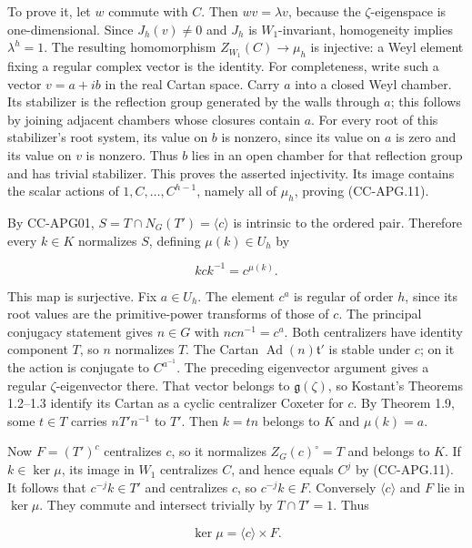 \documentclass[11pt,a4paper]{article}
\theoremstyle{definition}\newtheorem{definition}[theorem]{Definition}
\theoremstyle{remark}\newtheorem{remark}[theorem]{Remark}
\begin{document}
To prove it, let \(w\) commute with \(C\). Then \(wv=\lambda v\),
because the \(\zeta\)-eigenspace is one-dimensional. Since
\(J_h(v)\ne0\) and \(J_h\) is \(W_1\)-invariant, homogeneity implies
\(\lambda^h=1\). The resulting homomorphism \(Z_{W_1}(C)\to\mu_h\) is
injective: a Weyl element fixing a regular complex vector is the
identity. For completeness, write such a vector \(v=a+ib\) in the real
Cartan space. Carry \(a\) into a closed Weyl chamber. Its stabilizer is
the reflection group generated by the walls through \(a\); this follows
by joining adjacent chambers whose closures contain \(a\). For every
root of this stabilizer's root system, its value on \(b\) is nonzero,
since its value on \(a\) is zero and its value on \(v\) is nonzero. Thus
\(b\) lies in an open chamber for that reflection group and has trivial
stabilizer. This proves the asserted injectivity. Its image contains the
scalar actions of \(1,C,\ldots,C^{h-1}\), namely all of \(\mu_h\),
proving (CC-APG.11).

By CC-APG01, \(S=T\cap N_G(T')=\langle c\rangle\) is intrinsic to the
ordered pair. Therefore every \(k\in K\) normalizes \(S\), defining
\(\mu(k)\in U_h\) by

\[
 kck^{-1}=c^{\mu(k)}.
\]

This map is surjective. Fix \(a\in U_h\). The element \(c^a\) is regular
of order \(h\), since its root values are the primitive-power transforms
of those of \(c\). The principal conjugacy statement gives \(n\in G\)
with \(ncn^{-1}=c^a\). Both centralizers have identity component \(T\),
so \(n\) normalizes \(T\). The Cartan
\(\operatorname{Ad}(n)\mathfrak t'\) is stable under \(c\); on it the
action is conjugate to \(C^{a^{-1}}\). The preceding eigenvector
argument gives a regular \(\zeta\)-eigenvector there. That vector
belongs to \(\mathfrak g(\zeta)\), so Kostant's Theorems 1.2--1.3
identify its Cartan as a cyclic centralizer Coxeter for \(c\). By
Theorem 1.9, some \(t\in T\) carries \(nT'n^{-1}\) to \(T'\). Then
\(k=tn\) belongs to \(K\) and \(\mu(k)=a\).

Now \(F=(T')^c\) centralizes \(c\), so it normalizes \(Z_G(c)^\circ=T\)
and belongs to \(K\). If \(k\in\ker\mu\), its image in \(W_1\)
centralizes \(C\), and hence equals \(C^j\) by (CC-APG.11). It follows
that \(c^{-j}k\in T'\) and centralizes \(c\), so \(c^{-j}k\in F\).
Conversely \(\langle c\rangle\) and \(F\) lie in \(\ker\mu\). They
commute and intersect trivially by \(T\cap T'=1\). Thus

\[
 \ker\mu=\langle c\rangle\times F.
 \tag{CC-APG.12}
\]
\end{document}
